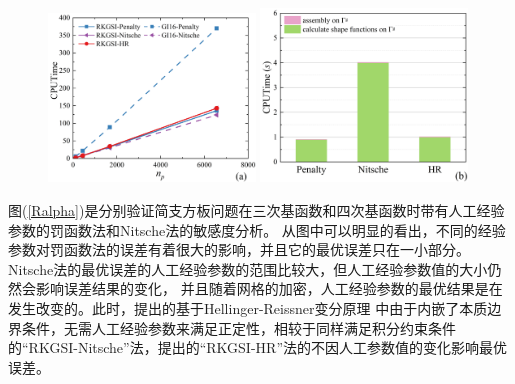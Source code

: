 \begin{figure}[H]
    \centering
    \begin{subcaptiongroup}
    \includegraphics[width=0.49\textwidth]{figure/PHR/R/Qcputime.png}
    \label{Qcputime}
    \includegraphics[width=0.49\textwidth]{figure/PHR/R/Qefficiency.png}
    \label{Qefficiency}
    \end{subcaptiongroup}
\caption{}
\label{RQcputime}
\end{figure}
图(\ref{Ralpha})是分别验证简支方板问题在三次基函数和四次基函数时带有人工经验参数的罚函数法和Nitsche法的敏感度分析。
从图中可以明显的看出，不同的经验参数对罚函数法的误差有着很大的影响，并且它的最优误差只在一小部分。
Nitsche法的最优误差的人工经验参数的范围比较大，但人工经验参数值的大小仍然会影响误差结果的变化，
并且随着网格的加密，人工经验参数的最优结果是在发生改变的。此时，提出的基于Hellinger-Reissner变分原理
中由于内嵌了本质边界条件，无需人工经验参数来满足正定性，相较于同样满足积分约束条件的“RKGSI-Nitsche”法，提出的“RKGSI-HR”法的不因人工参数值的变化影响最优误差。
